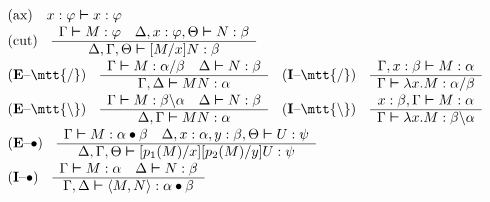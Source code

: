 \begin{table}
\caption{$\mathsf{L}$ with $\lambda$--Term Annotation}%
\label{tab:seq}
$$\begin{array}{ll}
\mbox{\rm (ax)} \quad x : \varphi \bvdash x : \varphi
   &   \\
\multicolumn{2}{l}{\mbox{\rm (cut)} \quad
\begin{array}{c}
\Gamma \bvdash M : \varphi \quad \Delta, x : \varphi, \Theta \bvdash
    N : \beta \\\hline
\Delta, \Gamma, \Theta \bvdash [M/x]N : \beta
\end{array}}
\\
\mbox{(\textbf{E}--{\mtt{\tf}})}\quad
\begin{array}{c}
\Gamma \bvdash M : \alpha/\beta \quad \Delta \bvdash N : \beta
\\\hline
\Gamma, \Delta \bvdash MN : \alpha
\end{array}
    &
\mbox{(\textbf{I}--{\mtt{\tf}})}\quad
\begin{array}{c}
\Gamma, x : \beta \bvdash M : \alpha \\\hline
\Gamma \bvdash \lambda x.M : \alpha/\beta
\end{array}
\\
\mbox{(\textbf{E}--{\mtt{\tb}})}\quad
\begin{array}{c}
\Gamma \bvdash M : \beta \backslash\alpha \quad \Delta \bvdash N : \beta
\\\hline
\Delta, \Gamma \bvdash MN : \alpha
\end{array}
    &
\mbox{(\textbf{I}--{\mtt{\tb}})}\quad
\begin{array}{c}
x : \beta, \Gamma \bvdash M : \alpha \\\hline
\Gamma \bvdash \lambda x.M : \beta \backslash \alpha
\end{array}
\\
\multicolumn{2}{l}{\mbox{(\textbf{E}--$\bullet$)}\quad
\begin{array}{c}
\Gamma \bvdash M : \alpha\bullet\beta \quad \Delta, x : \alpha, y : \beta,
    \Theta
     \bvdash U : \psi
\\\hline
\Delta, \Gamma, \Theta \bvdash [p_1(M)/x][p_2(M)/y]U : \psi
\end{array}} \\
\mbox{(\textbf{I}--$\bullet$)}\quad
\begin{array}{c}
\Gamma \bvdash M : \alpha \quad \Delta \bvdash N : \beta \\\hline
\Gamma, \Delta \bvdash \auf M, N\zu :
    \alpha \bullet \beta
\end{array}
\end{array}$$
\end{table}
